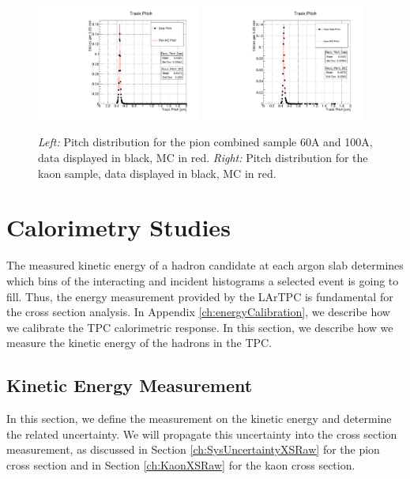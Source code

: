 \begin{figure}[p]
\centering
\includegraphics[width=0.48\textwidth]{Chapter-5/Images/PitchPi.pdf}
\includegraphics[width=0.48\textwidth]{Chapter-5/Images/PitchK.pdf}
\caption{\emph{Left:} Pitch distribution for the pion combined sample 60A and 100A, data displayed in black, MC in red. 
\emph{Right:} Pitch distribution for the kaon sample, data displayed in black, MC in red.}
\label{fig:Pitch}
\end{figure}

\clearpage

\section{Calorimetry Studies}\label{ch:energyCal} 
The measured kinetic energy of a hadron candidate at each argon slab determines which bins of the interacting and incident histograms a selected event is going to fill.  Thus, the energy measurement provided by the LArTPC is fundamental for the cross section analysis. In Appendix  \ref{ch:energyCalibration}, we describe how we calibrate the TPC calorimetric response. In this section, we describe how we measure the kinetic energy of the hadrons in the TPC.




\subsection{Kinetic Energy Measurement}\label{ch:kinEn}
In this section, we define the measurement on the kinetic energy and  determine the related uncertainty. We will propagate this uncertainty into the cross section measurement, as discussed in Section \ref{ch:SysUncertaintyXSRaw} for the pion cross section and in Section \ref{ch:KaonXSRaw} for the kaon cross section.

